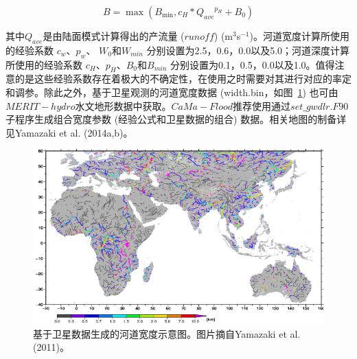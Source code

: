 \begin{equation}
B=\max \left(B_{\min }, c_{H} * {Q_{a v e}}^{p_{H}}+B_{0}\right)
\end{equation}

其中$Q_{ave}$是由陆面模式计算得出的产流量 ($runoff$) (m$^{3}$s$^{-1}$)。河道宽度计算所使用的经验系数 $c_w$、$p_w$、 $W_0$和$W_{min}$ 分别设置为2.5，0.6，0.0以及5.0；河道深度计算所使用的经验系数 $c_H$、$p_H$、$B_0$和$B_{min}$ 分别设置为0.1，0.5，0.0以及1.0。值得注意的是这些经验系数存在着极大的不确定性，在使用之时需要对其进行对应的率定和调参。除此之外，基于卫星观测的河道宽度数据 (width.bin，如图~\ref{fig:CaMa-Flood基于卫星数据生成的河道宽度示意图}) 也可由$MERIT-hydro$水文地形数据中获取。$CaMa-Flood$推荐使用通过$set\_gwdlr.F90$子程序生成组合宽度参数 (经验公式和卫星数据的组合) 数据。相关地图的制备详见Yamazaki et al. (2014a,b)。
{
\begin{figure}[]
\centering
\includegraphics{Figures/基础数据/CaMa-Flood基于卫星数据生成的河道宽度示意图.png}
\caption{基于卫星数据生成的河道宽度示意图。图片摘自Yamazaki et al. (2011)。}
\label{fig:CaMa-Flood基于卫星数据生成的河道宽度示意图}
\end{figure}
}



